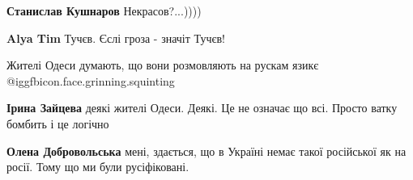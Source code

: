 \begin{itemize}
{\begin{itemize}{
 
\textbf{Станислав Кушнаров} Некрасов?...))))

 
\textbf{Alya Tim} Тучєв. Єслі гроза - значіт Тучєв!
}\end{itemize}

 
Жителі Одеси думають, що вони розмовляють на рускам язикє @igg{fbicon.face.grinning.squinting} 

\begin{itemize}{
 
\textbf{Ірина Зайцева} деякі жителі Одеси. Деякі. Це не означає що всі. Просто ватку бомбить і це логічно

 
\textbf{Олена Добровольська} мені, здається, що в Україні немає такої російської як на росії. Тому що ми були русіфіковані.
}\end{itemize}

 

}
\end{itemize}
